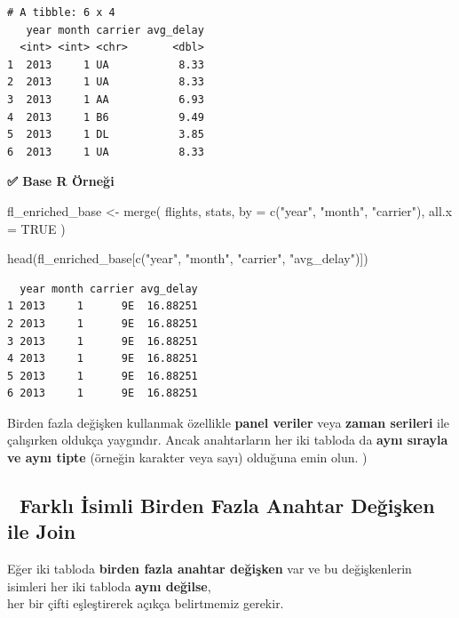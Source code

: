 \documentclass[
  letterpaper,
  DIV=11,
  numbers=noendperiod]{scrreprt}
\newenvironment{Shaded}{\begin{snugshade}}{\end{snugshade}}
\newcommand{\AttributeTok}[1]{\textcolor[rgb]{0.40,0.45,0.13}{#1}}
\newcommand{\ConstantTok}[1]{\textcolor[rgb]{0.56,0.35,0.01}{#1}}
\newcommand{\FunctionTok}[1]{\textcolor[rgb]{0.28,0.35,0.67}{#1}}
\newcommand{\NormalTok}[1]{\textcolor[rgb]{0.00,0.23,0.31}{#1}}
\newcommand{\OtherTok}[1]{\textcolor[rgb]{0.00,0.23,0.31}{#1}}
\newcommand{\StringTok}[1]{\textcolor[rgb]{0.13,0.47,0.30}{#1}}
\begin{document}
\begin{verbatim}
# A tibble: 6 x 4
   year month carrier avg_delay
  <int> <int> <chr>       <dbl>
1  2013     1 UA           8.33
2  2013     1 UA           8.33
3  2013     1 AA           6.93
4  2013     1 B6           9.49
5  2013     1 DL           3.85
6  2013     1 UA           8.33
\end{verbatim}

\textbf{✅ Base R Örneği}

\begin{Shaded}
\begin{Highlighting}[]
\NormalTok{fl\_enriched\_base }\OtherTok{\textless{}{-}} \FunctionTok{merge}\NormalTok{(}
\NormalTok{flights,}
\NormalTok{stats,}
\AttributeTok{by =} \FunctionTok{c}\NormalTok{(}\StringTok{"year"}\NormalTok{, }\StringTok{"month"}\NormalTok{, }\StringTok{"carrier"}\NormalTok{),}
\AttributeTok{all.x =} \ConstantTok{TRUE}
\NormalTok{)}

\FunctionTok{head}\NormalTok{(fl\_enriched\_base[}\FunctionTok{c}\NormalTok{(}\StringTok{"year"}\NormalTok{, }\StringTok{"month"}\NormalTok{, }\StringTok{"carrier"}\NormalTok{, }\StringTok{"avg\_delay"}\NormalTok{)])}
\end{Highlighting}
\end{Shaded}

\begin{verbatim}
  year month carrier avg_delay
1 2013     1      9E  16.88251
2 2013     1      9E  16.88251
3 2013     1      9E  16.88251
4 2013     1      9E  16.88251
5 2013     1      9E  16.88251
6 2013     1      9E  16.88251
\end{verbatim}

Birden fazla değişken kullanmak özellikle \textbf{panel veriler} veya
\textbf{zaman serileri} ile çalışırken oldukça yaygındır. Ancak
anahtarların her iki tabloda da \textbf{aynı sırayla ve aynı tipte}
(örneğin karakter veya sayı) olduğuna emin olun. )

\subsection*{🔄 Farklı İsimli Birden Fazla Anahtar Değişken ile
Join}\label{farklux131-isimli-birden-fazla-anahtar-deux11fiux15fken-ile-join}

Eğer iki tabloda \textbf{birden fazla anahtar değişken} var ve bu
değişkenlerin isimleri her iki tabloda \textbf{aynı değilse},\\
her bir çifti eşleştirerek açıkça belirtmemiz gerekir.
\end{document}

